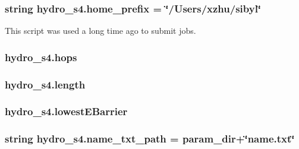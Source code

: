 \hypertarget{namespacehydro__s4_a121740595cf79da70a9d532130b2bd22}{
\subsubsection[{home\-\_\-prefix}]{\setlength{\rightskip}{0pt plus 5cm}string hydro\-\_\-s4.\-home\-\_\-prefix = \char`\"{}/Users/xzhu/sibyl\char`\"{}}}\label{namespacehydro__s4_a121740595cf79da70a9d532130b2bd22}


This script was used a long time ago to submit jobs. 

\hypertarget{namespacehydro__s4_a6c06da400ec3779d670a57a9cf48d4a8}{
\subsubsection[{hops}]{\setlength{\rightskip}{0pt plus 5cm}hydro\-\_\-s4.\-hops}}\label{namespacehydro__s4_a6c06da400ec3779d670a57a9cf48d4a8}
\hypertarget{namespacehydro__s4_abf356e81be21593cde6114d70bc649bc}{
\subsubsection[{length}]{\setlength{\rightskip}{0pt plus 5cm}hydro\-\_\-s4.\-length}}\label{namespacehydro__s4_abf356e81be21593cde6114d70bc649bc}
\hypertarget{namespacehydro__s4_aa066e1d9d5c9d3e6b6e995a931f327ba}{
\subsubsection[{lowest\-E\-Barrier}]{\setlength{\rightskip}{0pt plus 5cm}hydro\-\_\-s4.\-lowest\-E\-Barrier}}\label{namespacehydro__s4_aa066e1d9d5c9d3e6b6e995a931f327ba}
\hypertarget{namespacehydro__s4_aa46aed89aa2d5d8d4320276c3b510351}{
\subsubsection[{name\-\_\-txt\-\_\-path}]{\setlength{\rightskip}{0pt plus 5cm}string hydro\-\_\-s4.\-name\-\_\-txt\-\_\-path = {\bf param\-\_\-dir}+\char`\"{}name.\-txt\char`\"{}}}\label{namespacehydro__s4_aa46aed89aa2d5d8d4320276c3b510351}
